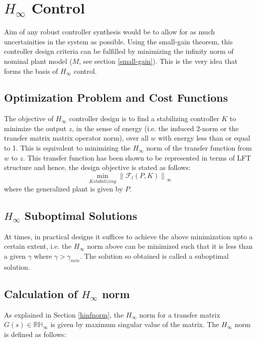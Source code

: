 \documentclass[a4paper,12pt]{article}
\newcommand\norm[1]{\left\lVert#1\right\rVert}
\begin{document}
		\section{$H_{\infty}$ Control} Aim of any robust controller synthesis would be to allow for as much uncertainities in the system as possible. Using the small-gain theorem, this controller design criteria can be fulfilled by minimizing the infinity norm of nominal plant model ($M$, see section \ref{small-gain}). This is the very idea that forms the basis of $H_{\infty}$  control.
			\subsection{Optimization Problem and Cost Functions} The objective of $H_{\infty}$ controller design is to find a stabilizing controller $K$ to minimize the output $z$, in the sense of energy (i.e. the induced 2-norm or the transfer matrix matrix operator norm), over all $w$ with energy less than or equal to 1. This is equivalent to minimizing the $H_{\infty}$ norm of the transfer function from $w$ to $z$. This transfer function has been shown to be represented in terms of LFT structure and hence, the design objective is stated as follows:
			\begin{equation}
				\min_{K stabilizing} \norm{\mathscr{F}_{l}(P,K)}_{\infty}
			\end{equation}
			where the generalized plant is given by $P$. 
			\subsection{$H_{\infty}$ Suboptimal Solutions} At times, in practical designs it suffices to achieve the above minimization upto a certain extent, i.e. the $H_{\infty}$ norm above can be minimized such that it is less than a given $\gamma$ where $\gamma > \gamma_{min}$. The solution so obtained is called a suboptimal solution. 
			\subsection{Calculation of $H_{\infty}$ norm} As explained in Section \ref{hinfnorm}, the $H_{\infty}$ norm for a transfer matrix $G(s) \in \mathbb{RH}_{\infty}$ is given by maximum singular value of the matrix. The $H_{\infty}$ norm is defined as follows:
			
\end{document}
